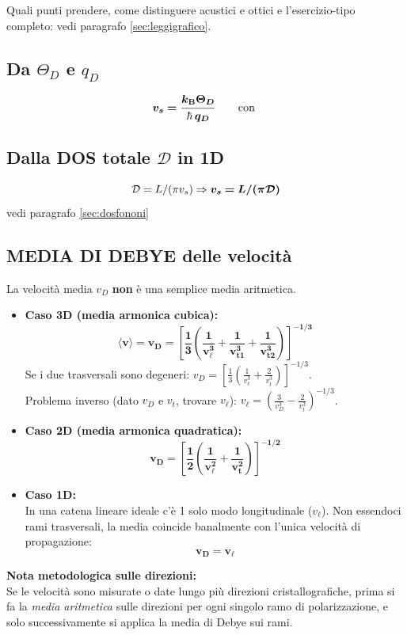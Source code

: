 Quali punti prendere, come distinguere acustici e ottici e l'esercizio-tipo completo: vedi paragrafo \ref{sec:leggigrafico}. 


\subsection{Da $\Theta_D$ e $q_D$}
\[ \bm{v_s = \frac{k_{\mathrm{B}}\Theta_D}{\hbar\,q_D}} \qquad\text{con }  \]

\subsection{Dalla DOS totale $\mathcal{D}$ in 1D}
\[\mathcal{D} = L/(\pi v_s) \Rightarrow \bm{v_s = L/(\pi\mathcal{D})}\] 
vedi paragrafo \ref{sec:dosfononi}

\subsection{MEDIA DI DEBYE delle velocità}
La velocità media $v_D$ \textbf{non} è una semplice media aritmetica.
\begin{itemize}
    \item  \textbf{Caso 3D (media armonica cubica):}
\[ \bm{\langle v\rangle = v_D = \left[\frac{1}{3}\left(\frac{1}{v_\ell^3}+\frac{1}{v_{t1}^3}+\frac{1}{v_{t2}^3}\right)\right]^{-1/3}} \]
Se i due trasversali sono degeneri: $\displaystyle v_D=\left[\frac13\left(\frac{1}{v_\ell^3}+\frac{2}{v_t^3}\right)\right]^{-1/3}$.
\\ Problema inverso (dato $v_D$ e $v_t$, trovare $v_\ell$):
$\displaystyle v_\ell = \left(\frac{3}{v_D^3}-\frac{2}{v_t^3}\right)^{-1/3}$.

\item \textbf{Caso 2D (media armonica quadratica):}
\[ \bm{v_D = \left[\frac{1}{2}\left(\frac{1}{v_\ell^2}+\frac{1}{v_t^2}\right)\right]^{-1/2}} \]

\item \textbf{Caso 1D:}
\\ In una catena lineare ideale c'è 1 solo modo longitudinale ($v_\ell$). Non essendoci rami trasversali, la media coincide banalmente con l'unica velocità di propagazione:
\[ \bm{v_D = v_\ell} \]
\end{itemize}
\vspace{0.3cm}
\noindent \textbf{Nota metodologica sulle direzioni:}
\\ Se le velocità sono misurate o date lungo più direzioni cristallografiche, prima si fa la \emph{media aritmetica} sulle direzioni per ogni singolo ramo di polarizzazione, e solo successivamente si applica la media di Debye sui rami.


